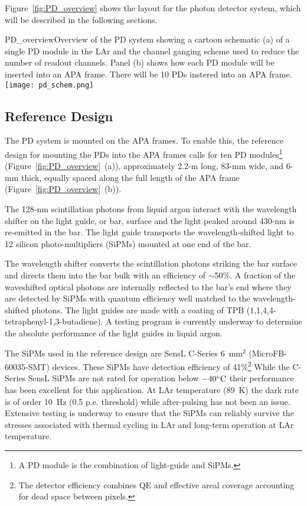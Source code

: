 Figure~\ref{fig:PD_overview} shows the layout for the photon detector
system, which will be described in the following sections.

\begin{cdrfigure}[PD Overview]{PD_overview}{Overview of the PD
    system showing a cartoon schematic (a) of a single PD module
    in the LAr and the channel ganging scheme used to reduce the
    number of readout channels. Panel (b) shows how each PD module
    will be inserted into an APA frame. There will be 10 PDs instered
    into an APA frame.}
\texttt{[image: pd\_schem.png]}
\end{cdrfigure}

\subsection{Reference Design}
\label{sec:detectors-fd-ref-pd-refsystem}   %

The PD system is mounted on the APA frames.  To enable this, the
reference design for mounting the PDs into the APA frames calls for
ten PD modules\footnote{A PD module is the combination of light-guide
and SiPMs.} (Figure~\ref{fig:PD_overview}~(a)), approximately 2.2-m
long, 83-mm wide, and 6-mm thick, equally spaced along the full length
of the APA frame (Figure~\ref{fig:PD_overview}~(b)).

The 128-nm scintillation photons from liquid argon interact with the
wavelength shifter on the light guide, or bar, surface and the light
peaked around 430-nm is re-emitted in the bar. The light guide
transports the wavelength-shifted light to 12 silicon
photo-multipliers (SiPMs) mounted at one end of the bar.

The wavelength shifter converts the scintillation photons striking the
bar surface and directs them into the bar bulk with an efficiency of
$\sim$50\%.  A fraction of the waveshifted optical photons are
internally reflected to the bar's end where they are detected by SiPMs
with quantum efficiency well matched to the wavelength-shifted
photons. The light guides are made with a coating of TPB
(1,1,4,4-tetraphenyl-1,3-butadiene). A testing program is currently
underway to determine the absolute performance of the light guides in
liquid argon.

The SiPMs used in the reference design are SensL C-Series 6~mm$^2$
(MicroFB-60035-SMT) devices. These SiPMs have detection efficiency of
41\%\footnote{The detector efficiency combines QE and effective areal
  coverage accounting for dead space between pixels.} While the
C-Series SensL SiPMs are not rated for operation below
$-40^{\circ}{\rm C}$ their performance has been excellent for this
application. At LAr temperature (89~K) the dark rate is of order 10~Hz
(0.5 p.e. threshold) while after-pulsing has not been an
issue. Extensive testing is underway to ensure that the SiPMs can
reliably survive the stresses associated with thermal cycling in LAr
and long-term operation at LAr temperature.

